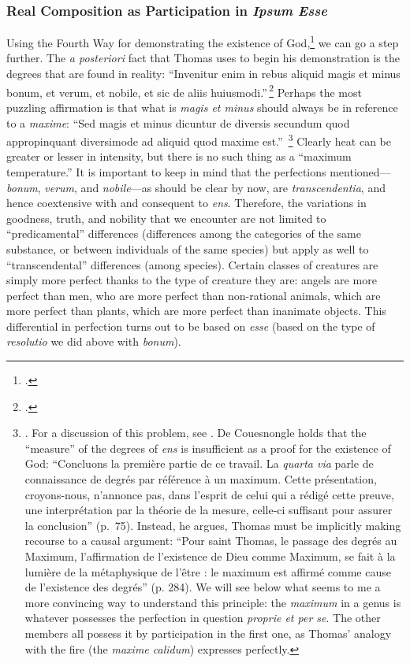 \subsubsection{Real Composition as Participation in \emph{Ipsum Esse}}

Using the Fourth Way for demonstrating the existence of God,\footcite[See][I, q.~2, a.~3, co.]{st:summa} we can go a step further. The \emph{a posteriori} fact that Thomas uses to begin his demonstration is the degrees that are found in reality: ``Invenitur enim in rebus aliquid magis et minus bonum, et verum, et nobile, et sic de aliis huiusmodi.''\,\footcite[I, q.~2, a.~3, co.]{st:summa}
Perhaps the most puzzling affirmation is that what is \emph{magis et minus} should always be in reference to a \emph{maxime}: ``Sed magis et minus dicuntur de diversis secundum quod appropinquant diversimode ad aliquid quod maxime est.''\,%
%
\footnote{\Cite[I, q.~2, a.~3, co.]{st:summa}. For a discussion of this problem, see \cite{couesnongle:mesure}. De Couesnongle holds that the ``measure'' of the degrees of \emph{ens} is insufficient as a proof for the existence of God: ``Concluons la première partie de ce travail. La \emph{quarta via} parle de connaissance de degrés par référence à un maximum. Cette présentation, croyons-nous, n'annonce pas, dans l'esprit de celui qui a rédigé cette preuve, une interprétation par la théorie de la mesure, celle-ci suffisant pour assurer la conclusion'' (p.~75). Instead, he argues, Thomas must be implicitly making recourse to a causal argument: ``Pour saint Thomas, le passage des degrés au Maximum, l'affirmation de l'existence de Dieu comme Maximum, se fait à la lumière de la métaphysique de l'être : le maximum est affirmé comme cause de l'existence des degrés'' (p. 284). We will see below what seems to me a more convincing way to understand this principle: the \emph{maximum} in a genus is whatever possesses the perfection in question \emph{proprie et per se}. The other members all possess it by participation in the first one, as Thomas' analogy with the fire (the \emph{maxime calidum}) expresses perfectly.}
%
Clearly heat can be greater or lesser in intensity, but there is no such thing as a ``maximum temperature.'' It is important to keep in mind that the perfections mentioned---\emph{bonum}, \emph{verum}, and \emph{nobile}---as should be clear by now, are \emph{transcendentia}, and hence coextensive with and consequent to \emph{ens}. Therefore, the variations in goodness, truth, and nobility that we encounter are not limited to ``predicamental'' differences (differences among the categories of the same substance, or between individuals of the same species) but apply as well to ``transcendental'' differences (among species). Certain classes of creatures are simply more perfect thanks to the type of creature they are: angels are more perfect than men, who are more perfect than non-rational animals, which are more perfect than plants, which are more perfect than inanimate objects. This differential in perfection turns out to be based on \emph{esse} (based on the type of \emph{resolutio} we did above with \emph{bonum}).

